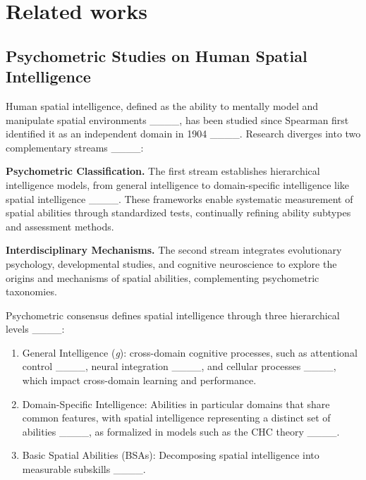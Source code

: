 \section{Related works}


\subsection{Psychometric Studies on Human Spatial Intelligence}

Human spatial intelligence, defined as the ability to mentally model and manipulate spatial environments ____, has been studied since Spearman first identified it as an independent domain in 1904 ____. Research diverges into two complementary streams ____:

\textbf{Psychometric Classification.} The first stream establishes hierarchical intelligence models, from general intelligence to domain-specific intelligence like spatial intelligence ____. These frameworks enable systematic measurement of spatial abilities through standardized tests, continually refining ability subtypes and assessment methods.

\textbf{Interdisciplinary Mechanisms.} The second stream integrates evolutionary psychology, developmental studies, and cognitive neuroscience to explore the origins and mechanisms of spatial abilities, complementing psychometric taxonomies.

Psychometric consensus defines spatial intelligence through three hierarchical levels ____:

\begin{enumerate}

\item General Intelligence (\textit{g}): cross-domain cognitive processes, such as attentional control ____, neural integration ____, and cellular processes ____, which impact cross-domain learning and performance.

\item Domain-Specific Intelligence: Abilities in particular domains that share common features, with spatial intelligence representing a distinct set of abilities ____, as formalized in models such as the CHC theory ____.

\item Basic Spatial Abilities (BSAs): Decomposing spatial intelligence into measurable subskills ____.

\end{enumerate}

